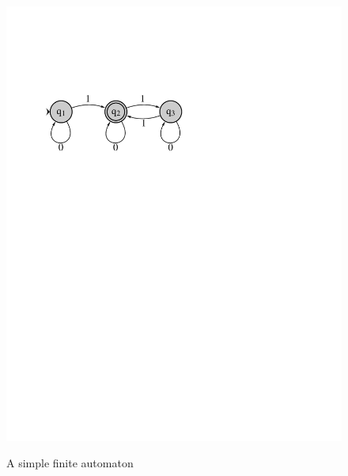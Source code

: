 \begin{figure}
\begin{center}
\resizebox{\textwidth}{!}
  {\includegraphics{automin1.pdf}}
\end{center}
\caption{A simple finite automaton}
\label{autom}
\end{figure}
